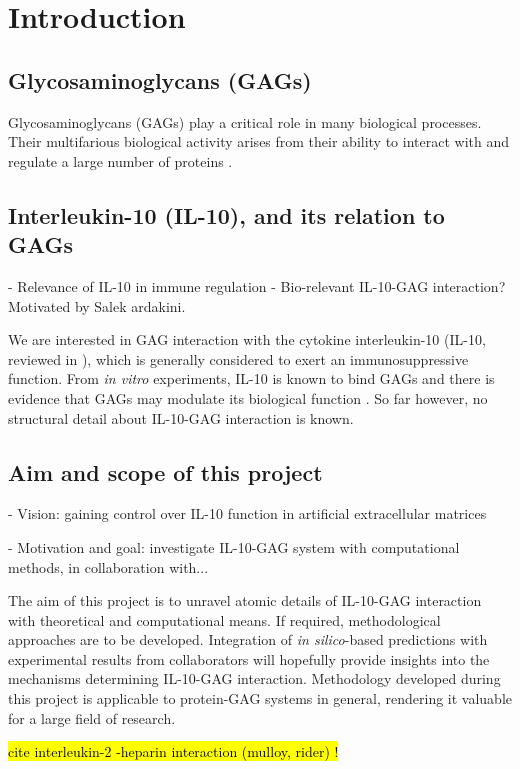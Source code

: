 \chapter{Introduction}


\section{Glycosaminoglycans (GAGs)}
\label{intro:gags}

Glycosaminoglycans (GAGs) play a critical role in many biological processes.
Their multifarious biological activity arises from their ability to interact
with and regulate a large number of proteins \cite{handel_2005}.


\section{Interleukin-10 (IL-10), and its relation to GAGs}

- Relevance of IL-10 in immune regulation
- Bio-relevant IL-10-GAG interaction? Motivated by Salek ardakini.

We are interested in GAG interaction with the cytokine interleukin-10 (IL-10,
reviewed in \cite{moore_2001}), which is generally considered to exert an
immunosuppressive function. From \textit{in vitro} experiments, IL-10 is known
to bind GAGs and there is evidence that GAGs may modulate its biological
function \cite{salek_ardakani_2000}. So far however, no structural detail about
IL-10-GAG interaction is known.


\section{Aim and scope of this project}

- Vision: gaining control over IL-10 function in artificial extracellular matrices

- Motivation and goal: investigate IL-10-GAG system with computational
      methods, in collaboration with...

The aim of this project is to unravel atomic details of IL-10-GAG interaction
with theoretical and computational means. If required, methodological approaches
are to be developed. Integration of \textit{in silico}-based predictions with
experimental results from collaborators will hopefully provide insights into the
mechanisms determining IL-10-GAG interaction. Methodology developed during this
project is applicable to protein-GAG systems in general, rendering it valuable
for a large field of research.



\hl{cite interleukin-2 -heparin interaction (mulloy, rider) !}

\lipsum[1-5]





